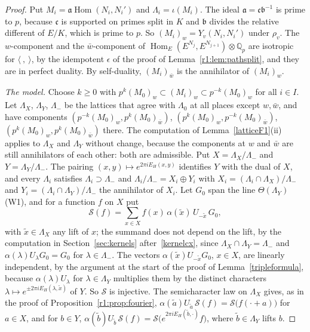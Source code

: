 \begin{proof}
Put $M_i=\mathfrak a\operatorname{Hom}(N_i,N_i')$ and $\Lambda_i=\iota(M_i)$. The ideal $\mathfrak a=\mathfrak c\mathfrak b^{-1}$ is prime to $p$, because $\mathfrak c$ is supported on primes split in $K$ and $\mathfrak b$ divides the relative different of $E/K$, which is prime to $p$. So $(M_i)_w=Y_v(N_i,N_i')$ under $\rho_v$. The $w$-component and the $\bar w$-component of $\operatorname{Hom}_E(E^{N_j},E^{N_{j+1}})\otimes\mathbb Q_p$ are isotropic for $\langle\ ,\ \rangle$, by the idempotent $\epsilon$ of the proof of Lemma~\ref{r1:lem:pathsplit}, and they are in perfect duality. By self-duality, $(M_i)_{\bar w}$ is the annihilator of $(M_i)_w$.

\emph{The model.} Choose $k\ge0$ with $p^k(M_0)_w\subset(M_i)_w\subset p^{-k}(M_0)_w$ for all $i\in I$. Let $\Lambda_X$, $\Lambda_Y$, $\Lambda_-$ be the lattices that agree with $\Lambda_0$ at all places except $w,\bar w$, and have components $(p^{-k}(M_0)_w,p^k(M_0)_{\bar w})$, $(p^{k}(M_0)_w,p^{-k}(M_0)_{\bar w})$, $(p^{k}(M_0)_w,p^{k}(M_0)_{\bar w})$ there. The computation of Lemma~\ref{latticeF1}(ii) applies to $\Lambda_X$ and $\Lambda_Y$ without change, because the components at $w$ and $\bar w$ are still annihilators of each other: both are admissible. Put $X=\Lambda_X/\Lambda_-$ and $Y=\Lambda_Y/\Lambda_-$. The pairing $(x,y)\mapsto e^{2\pi iE_H(x,y)}$ identifies $Y$ with the dual of $X$, and every $\Lambda_i$ satisfies $\Lambda_i\supset\Lambda_-$ and $\Lambda_i/\Lambda_-=X_i\oplus Y_i$ with $X_i=(\Lambda_i\cap\Lambda_X)/\Lambda_-$ and $Y_i=(\Lambda_i\cap\Lambda_Y)/\Lambda_-$ the annihilator of $X_i$. Let $G_0$ span the line $\Theta(\Lambda_Y)$ (W1), and for a function $f$ on $X$ put
\[
\mathcal S(f)=\sum_{x\in X}f(x)\,\alpha(\tilde x)\,U_{-\tilde x}\,G_0,
\]
with $\tilde x\in\Lambda_X$ any lift of $x$; the summand does not depend on the lift, by the computation in Section~\ref{sec:kernels} after~\eqref{kernelcx}, since $\Lambda_X\cap\Lambda_Y=\Lambda_-$ and $\alpha(\lambda)U_\lambda G_0=G_0$ for $\lambda\in\Lambda_-$. The vectors $\alpha(\tilde x)U_{-\tilde x}G_0$, $x\in X$, are linearly independent, by the argument at the start of the proof of Lemma~\ref{tripleformula}, because $\alpha(\lambda)U_\lambda$ for $\lambda\in\Lambda_Y$ multiplies them by the distinct characters $\lambda\mapsto e^{\pm2\pi iE_H(\lambda,\tilde x)}$ of $Y$. So $\mathcal S$ is injective. The semicharacter law on $\Lambda_X$ gives, as in the proof of Proposition~\ref{r1:prop:fourier}, $\alpha(\tilde a)U_{\tilde a}\,\mathcal S(f)=\mathcal S\big(f(\cdot+a)\big)$ for $a\in X$, and for $b\in Y$, $\alpha(\tilde b)U_{\tilde b}\,\mathcal S(f)=\mathcal S\big(e^{2\pi iE_H(\tilde b,\cdot)}f\big)$, where $\tilde b\in\Lambda_Y$ lifts $b$.


\end{proof}
